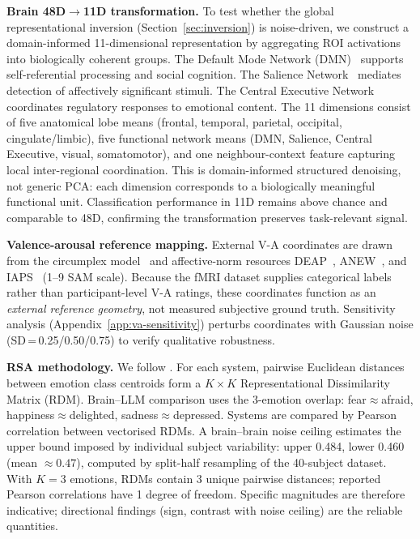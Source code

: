 \documentclass{article}
\begin{document}
\textbf{Brain 48D$\to$11D transformation.}
To test whether the global representational inversion (Section~\ref{sec:inversion})
is noise-driven, we construct a domain-informed 11-dimensional representation by
aggregating ROI activations into biologically coherent groups.
The Default Mode Network (DMN)~\citep{li2014dmn} supports self-referential processing
and social cognition.
The Salience Network~\citep{seeley2019} mediates detection of affectively significant
stimuli.
The Central Executive Network~\citep{miller2001} coordinates regulatory responses to
emotional content.
The 11 dimensions consist of five anatomical lobe means (frontal, temporal, parietal,
occipital, cingulate/limbic), five functional network means (DMN, Salience, Central
Executive, visual, somatomotor), and one neighbour-context feature capturing local
inter-regional coordination.
This is domain-informed structured denoising, not generic PCA: each dimension
corresponds to a biologically meaningful functional unit.
Classification performance in 11D remains above chance and comparable to 48D,
confirming the transformation preserves task-relevant signal.

\textbf{Valence-arousal reference mapping.}
External V-A coordinates are drawn from the circumplex model~\citep{russell1980,
mehrabian1974} and affective-norm resources DEAP~\citep{koelstra2012},
ANEW~\citep{bradley1999}, and IAPS~\citep{lang2008} (1--9 SAM scale).
Because the fMRI dataset supplies categorical labels rather than participant-level V-A
ratings, these coordinates function as an \emph{external reference geometry},
not measured subjective ground truth.
Sensitivity analysis (Appendix~\ref{app:va-sensitivity}) perturbs coordinates with
Gaussian noise (SD\,=\,0.25/0.50/0.75) to verify qualitative robustness.

\textbf{RSA methodology.}
We follow \citet{kriegeskorte2008}.
For each system, pairwise Euclidean distances between emotion class centroids form a
$K \times K$ Representational Dissimilarity Matrix (RDM).
Brain--LLM comparison uses the 3-emotion overlap: fear$\approx$afraid,
happiness$\approx$delighted, sadness$\approx$depressed.
Systems are compared by Pearson correlation between vectorised RDMs.
A brain--brain noise ceiling estimates the upper bound imposed by individual subject
variability: upper 0.484, lower 0.460 (mean $\approx\!0.47$), computed by split-half
resampling of the 40-subject dataset.
With $K\!=\!3$ emotions, RDMs contain 3 unique pairwise distances;
reported Pearson correlations have 1 degree of freedom.
Specific magnitudes are therefore indicative; directional findings (sign, contrast with
noise ceiling) are the reliable quantities.
\end{document}
